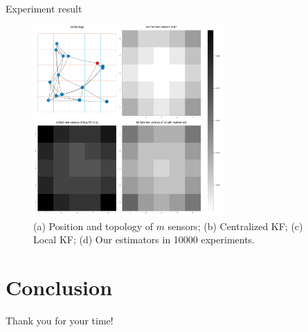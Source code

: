 \documentclass[10pt]{beamer}
\DeclareMathOperator{\1}{\textbf{1}}
\begin{document}
	      \begin{frame}{Experiment result}
		\begin{figure}[]
		  \centering
		  \includegraphics[width=0.65\textwidth]{pic/variance.pdf}
		  \caption{(a) Position and topology of $m$ sensors; (b) Centralized KF; (c) Local KF; (d) Our estimators in 10000 experiments.}
		\end{figure}
	      \end{frame}


	      \section{Conclusion}

	      \begin{frame}[standout]
		Thank you for your time! 
	      \end{frame}

	      
\end{document}

